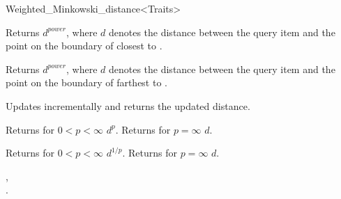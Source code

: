 \begin{ccRefClass}{Weighted_Minkowski_distance<Traits>}
\ccOperations



{Returns $d^{power}$, where $d$ denotes the distance between the query item  and
the point on the boundary of  closest to .}

{Returns $d^{power}$, where $d$ denotes the distance between the query item  and
the point on the boundary of  farthest to .}

 {Updates  incrementally
and returns the updated distance.}

 {Returns for $0 < p <\infty$ $d^p$. Returns for $p=\infty$ $d$.}

 {Returns for $0 < p <\infty$ $d^{1/p}$}.
{Returns for $p=\infty$ $d$.}
 

\ccSeeAlso

,\\
.

\end{ccRefClass}


